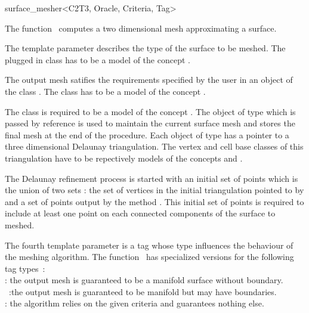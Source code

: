 

\begin{ccRefFunction}{surface_mesher<C2T3, Oracle,
Criteria, Tag>}  %


\ccDefinition
  
The function \ccRefName\ computes a two dimensional mesh 
approximating  a surface.

The template parameter  describes the type of the 
surface  to be meshed. 
The plugged in class 
has to be a model of the concept .

The output mesh satifies the requirements specified by the user
in an object of the class .
The class  has to be
a model of the concept .

 The class 
is required to be a model of the concept
.
The object  of type  which is passed by reference
is used to maintain  the current surface mesh and stores
the final mesh at the end of the procedure.
Each object of type  has a pointer to 
a three dimensional  Delaunay triangulation.
The vertex and cell base classes of this triangulation
have  to be repectively  models  of the concepts 
 and 
.

The Delaunay refinement
process is started with an initial set of points which is the union 
of two sets : the
set of vertices in the initial  triangulation pointed to by 
 and a set of
points output by the method .
This initial set of points is required to include at least one point
on each connected components of the surface to meshed.

The fourth template parameter is a tag whose type influences the behaviour of the
meshing algorithm. The function \ccRefName\  has specialized versions
for the following  tag types~: \\
 : the output mesh is guaranteed to be a manifold
surface without boundary.\\
~:the output mesh is guaranteed to be
manifold but may have boundaries.\\
 : the algorithm relies on the given criteria and
guarantees nothing else.




\end{ccRefFunction}
